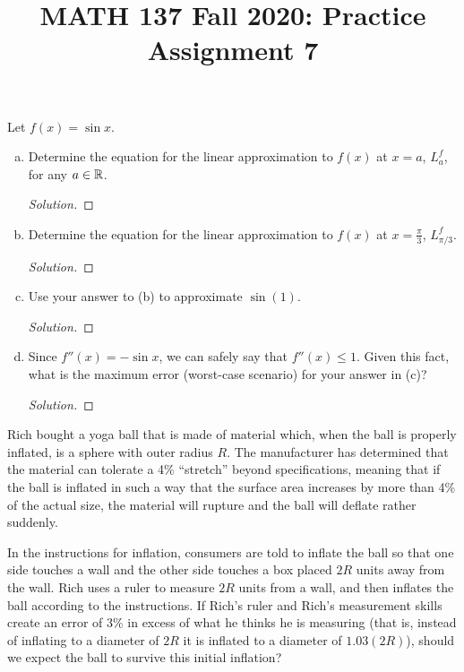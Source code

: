 
\title{MATH 137 Fall 2020: Practice Assignment 7}


\thispagestyle{firstpage}

\textbf{\@title}

\question Let $f(x)=\sin x$.
\begin{enumerate}[(a)]
  \item Determine the equation for the linear approximation to $f(x)$ at $x=a$, $L^f_a$, for any $a\in\mathbb{R}$.
        \begin{proof}[Solution]
        \end{proof}
  \item Determine the equation for the linear approximation to $f(x)$ at $x=\frac\pi3$, $L^f_{\pi/3}$.
        \begin{proof}[Solution]
        \end{proof}
  \item Use your answer to (b) to approximate $\sin(1)$.
        \begin{proof}[Solution]
        \end{proof}
  \item Since $f''(x)=-\sin x$, we can safely say that $f''(x) \leq 1$.
        Given this fact, what is the maximum error (worst-case scenario) for your answer in (c)?
        \begin{proof}[Solution]
        \end{proof}
\end{enumerate}


\question Rich bought a yoga ball that is made of material which,
when the ball is properly inflated, is a sphere with outer radius $R$.
The manufacturer has determined that the material can tolerate a 4\% ``stretch'' beyond specifications,
meaning that if the ball is inflated in such a way that the surface area increases by more than 4\%
of the actual size, the material will rupture and the ball will deflate rather suddenly.

In the instructions for inflation, consumers are told to inflate the ball
so that one side touches a wall and the other side touches a box placed $2R$ units away from the wall.
Rich uses a ruler to measure $2R$ units from a wall, and then inflates the ball according to the instructions.
If Rich's ruler and Rich's measurement skills create an error of 3\% in excess of what he thinks he is measuring
(that is, instead of inflating to a diameter of $2R$ it is inflated to a diameter of $1.03(2R)$),
should we expect the ball to survive this initial inflation?

